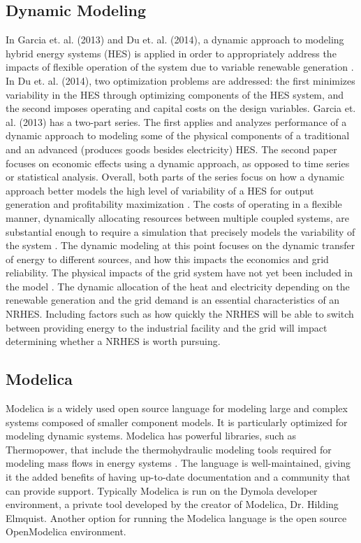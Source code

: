 \documentclass{article}                                                                           %
\begin{document}
\begin{linenumbers}
\subsection{Dynamic Modeling}
In Garcia et. al. (2013) and Du et. al. (2014), a dynamic approach to modeling hybrid energy systems (HES) is applied in order to appropriately address the impacts of flexible operation of the system due to variable renewable generation \cite{Garcia2013, Du2014}. In Du et. al. (2014), two optimization problems are addressed: the first minimizes variability in the HES through optimizing components of the HES system, and the second imposes operating and capital costs on the design variables. Garcia et. al. (2013) has a two-part series. The first applies and analyzes performance of a dynamic approach to modeling some of the physical components of a traditional and an advanced (produces goods besides electricity) HES. The second paper focuses on economic effects using a dynamic approach, as opposed to time series or statistical analysis. Overall, both parts of the series focus on how a dynamic approach better models the high level of variability of a HES for output generation and profitability maximization \cite{Garcia2013}. The costs of operating in a flexible manner, dynamically allocating resources between multiple coupled systems, are substantial enough to require a simulation that precisely models the variability of the system \cite{Garcia2013, Shropshire2011, Locatelli2015}. The dynamic modeling at this point focuses on the dynamic transfer of energy to different sources, and how this impacts the economics and grid reliability. The physical impacts of the grid system have not yet been included in the model \cite{Harrison2016}.  The dynamic allocation of the heat and electricity depending on the renewable generation and the grid demand is an essential characteristics of an NRHES.  Including factors such as how quickly the NRHES will be able to switch between providing energy to the industrial facility and the grid will impact determining whether a NRHES is worth pursuing.

\subsection{Modelica}
Modelica is a widely used open source language for modeling large and complex systems composed of smaller component models. It is particularly optimized for modeling dynamic systems. Modelica has powerful libraries, such as Thermopower, that include the thermohydraulic modeling tools required for modeling mass flows in energy systems \cite{Binder2014}. The language is well-maintained, giving it the added benefits of having up-to-date documentation and a community that can provide support. Typically Modelica is run on the Dymola developer environment, a private tool developed by the creator of Modelica, Dr. Hilding Elmquist. Another option for running the Modelica language is the open source OpenModelica environment.


\end{linenumbers}
\end{document}
